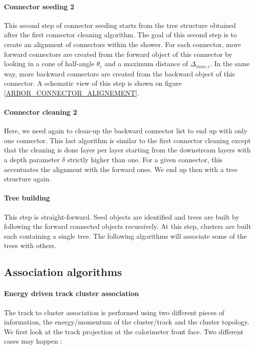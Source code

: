 \documentclass[cits]{JINST}
\begin{document}
\paragraph*{Connector seeding 2} This second step of connector seeding starts from the tree structure obtained after the first connector cleaning algorithm. The goal of this second step is to create an alignment of connectors within the shower. For each connector, more forward connectors are created from the forward object of this connector by looking in a cone of half-angle $\theta_c$ and a maximum distance of $\Delta_{max,c}$. In the same way, more backward connectors are created from the backward object of this connector. A schematic view of this step is shown on figure \ref{ARBOR_CONNECTOR_ALIGNEMENT}.

\paragraph*{Connector cleaning 2} Here, we need again to clean-up the backward connector list to end up with only one connector. This last algorithm is similar to the first connector cleaning except that the cleaning is done layer per layer starting from the downstream layers with a depth parameter $\delta$ strictly higher than one. For a given connector, this accentuates the alignment with the forward ones. We end up then with a tree structure again.

\paragraph*{Tree building} This step is straight-forward. Seed objects are identified and trees are built by following the forward connected objects recursively. At this step, clusters are built each containing a single tree. The following algorithms will associate some of the trees with others.

\subsection{Association algorithms}

\paragraph*{Energy driven track cluster association} The track to cluster association is performed using two different pieces of information, the energy/momentum of the cluster/track and the cluster topology. We first look at the track projection at the calorimeter front face. Two different cases may happen :
\end{document}
